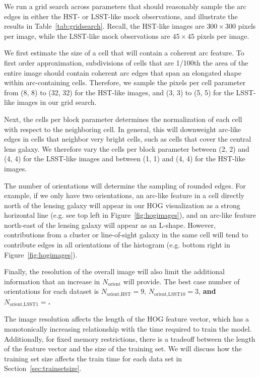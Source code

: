 \documentclass{emulateapj}
\newcommand{\todo}[1]{{\bf\color{blue} #1}}
\begin{document}
We run a grid search across parameters that should reasonably sample
the arc edges in either the HST- or LSST-like mock observations, and
illustrate the results in Table~\ref{tab:gridsearch}.  Recall, the
HST-like images are $300\times300$ pixels per image, while the
LSST-like mock observations are $45\times45$ pixels per image.

We first estimate the size of a cell that will contain a coherent arc
feature.  To first order approximation, subdivisions of cells that are
1/100th the area of the entire image should contain coherent arc edges
that span an elongated shape within arc-containing cells.  Therefore,
we sample the pixels per cell parameter from (8, 8) to (32, 32) for
the HST-like images, and (3, 3) to (5, 5) for the LSST-like images in
our grid search.

Next, the cells per block parameter determines the normalization of
each cell with respect to the neighboring cell.  In general, this will
downweight arc-like edges in cells that neighbor very bright cells,
such as cells that cover the central lens galaxy.  We therefore vary
the cells per block parameter between (2, 2) and (4, 4) for the
LSST-like images and between (1, 1) and (4, 4) for the HST-like
images.

The number of orientations will determine the sampling of rounded
edges.  For example, if we only have two orientations, an arc-like
feature in a cell directly north of the lensing galaxy will appear in
our HOG visualization as a strong horizontal line (e.g. see top left
in Figure~\ref{fig:hogimages}), and an arc-like feature north-east of
the lensing galaxy will appear as an L-shape.  However, contributions
from a cluster or line-of-sight galaxy in the same cell will tend to
contribute edges in all orientations of the histogram (e.g. bottom
right in Figure~\ref{fig:hogimages}).  

Finally, the resolution of the overall image will also limit the
additional information that an increase in $N_\text{orient}$ will
provide.  The best case number of orientations for each dataset is
$N_\text{orient,HST}=9$, $N_\text{orient,LSST10}=3$, \todo{and
  $N_\text{orient,LSST1}=$.}

The image resolution affects the length of the HOG feature vector,
which has a monotonically increasing relationship with the time
required to train the model.  Additionally, for fixed memory
restrictions, there is a tradeoff between the length of the feature
vector and the size of the training set.  We will discuss how the
training set size affects the train time for each data set in
Section~\ref{sec:trainsetsize}.
\end{document}
